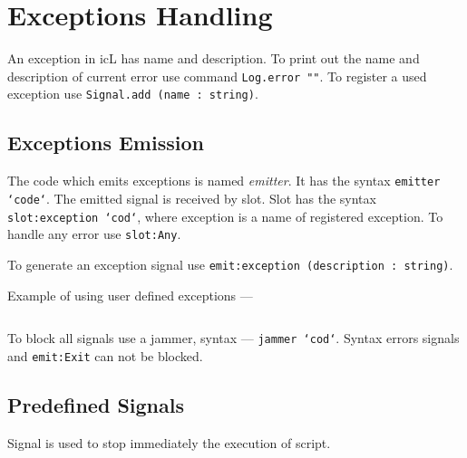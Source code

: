 \section{Exceptions Handling}

An exception in icL has name and description. To print out the name and description of current error use command \texttt{Log.error ""}. To register a used exception use \texttt{Signal.add (name : string)}.

\subsection{Exceptions Emission}

The code which emits exceptions is named {\it emitter}. It has the syntax \texttt{emitter {`code`}}. The emitted signal is received by slot. Slot has the syntax \texttt{slot:exception {`cod`}}, where exception is a name of registered exception. To handle any error use \texttt{slot:Any}.

To generate an exception signal use \texttt{emit:exception (description : string)}.

Example of using user defined exceptions —
\inputminted[linenos]{icl}{../sources/sighandling.icL}

To block all signals use a jammer, syntax — \texttt{jammer {`cod`}}. Syntax errors signals and \texttt{emit:Exit} can not be blocked.

\subsection{Predefined Signals}

Signal  is used to stop immediately the execution of script.

